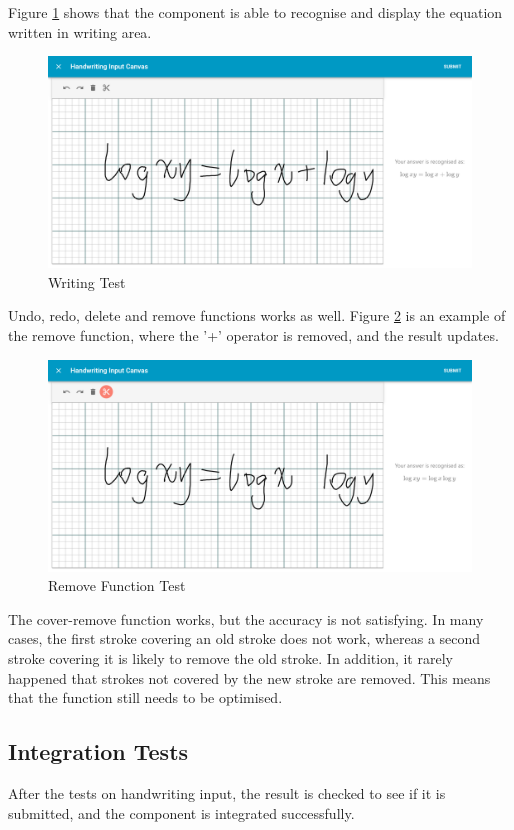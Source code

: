 \documentclass[12pt,twoside]{report}
\begin{document}
Figure \ref{fig:test-write} shows that the component is able to recognise and display the equation written in writing area.
\begin{figure}[H]
    \centering
    \includegraphics[width=\linewidth, frame]{figures/test-write.png}
    \caption{Writing Test}
    \label{fig:test-write}
\end{figure}

Undo, redo, delete and remove functions works as well. Figure \ref{fig:test-remove} is an example of the remove function, where the '+' operator is removed, and the result updates.
\begin{figure}[H]
    \centering
    \includegraphics[width=\linewidth, frame]{figures/test-remove.png}
    \caption{Remove Function Test}
    \label{fig:test-remove}
\end{figure}

The cover-remove function works, but the accuracy is not satisfying. In many cases, the first stroke covering an old stroke does not work, whereas a second stroke covering it is likely to remove the old stroke. In addition, it rarely happened that strokes not covered by the new stroke are removed. This means that the function still needs to be optimised.

\subsection*{Integration Tests}
After the tests on handwriting input, the result is checked to see if it is submitted, and the component is integrated successfully.
\end{document}

